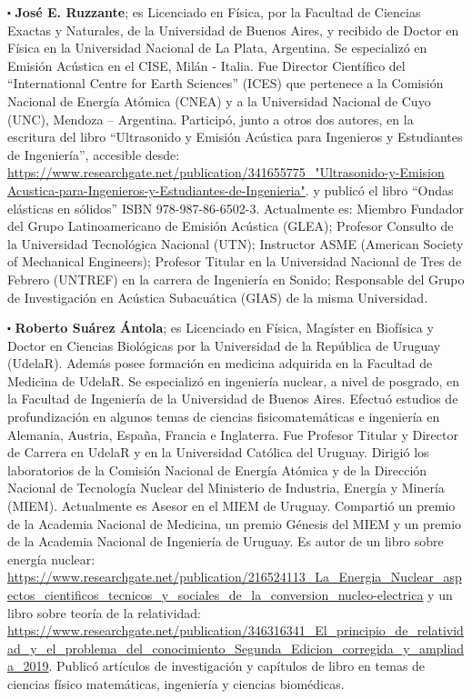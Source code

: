 \documentclass[
11pt, %
spanish,
singlespacing, %
parskip, %
headsepline, %
]{MastersDoctoralThesis} %
\begin{document}
\begin{sloppypar}


$\centerdot$ \textbf{José E. Ruzzante}; es Licenciado en Física, por la Facultad de Ciencias Exactas y Naturales, de la Universidad de Buenos Aires, y recibido de Doctor en Física en la Universidad Nacional de La Plata, Argentina. Se especializó en Emisión Acústica en el CISE, Milán - Italia. Fue Director Científico del “International Centre for Earth Sciences” (ICES) que pertenece a la Comisión Nacional de Energía Atómica (CNEA) y a la Universidad Nacional de Cuyo (UNC), Mendoza – Argentina. Participó, junto a otros dos autores, en la escritura del libro “Ultrasonido y Emisión Acústica para Ingenieros y Estudiantes de Ingeniería”, accesible desde: \url{https://www.researchgate.net/publication/341655775_"Ultrasonido-y-Emision Acustica-para-Ingenieros-y-Estudiantes-de-Ingenieria"}. y publicó el libro “Ondas elásticas en sólidos” ISBN 978-987-86-6502-3.
 Actualmente es:  Miembro Fundador del Grupo Latinoamericano de Emisión Acústica (GLEA);  Profesor Consulto de la Universidad Tecnológica Nacional (UTN);  Instructor ASME (American Society of Mechanical Engineers); Profesor Titular en la Universidad Nacional de Tres de Febrero (UNTREF) en la carrera de Ingeniería en Sonido;  Responsable del Grupo de Investigación en Acústica Subacuática (GIAS) de la misma Universidad.
 
$\centerdot$ \textbf{Roberto Suárez Ántola}; es Licenciado en Física, Magíster en Biofísica y Doctor en Ciencias Biológicas por la Universidad de la República de Uruguay (UdelaR).  Además posee formación en medicina adquirida en la Facultad de Medicina de UdelaR. Se especializó en ingeniería nuclear, a nivel de posgrado, en la Facultad de Ingeniería de la Universidad de Buenos Aires. Efectuó estudios de profundización en algunos temas de ciencias fisicomatemáticas e ingeniería en Alemania, Austria, España, Francia e Inglaterra.
Fue Profesor Titular y Director de Carrera en UdelaR y en la Universidad Católica del Uruguay. Dirigió los laboratorios de la Comisión Nacional de Energía Atómica y de la Dirección Nacional de Tecnología Nuclear del Ministerio de Industria, Energía y Minería (MIEM). Actualmente es Asesor en el MIEM de Uruguay. Compartió un premio de la Academia Nacional de Medicina, un premio Génesis del MIEM y un premio de la Academia Nacional de Ingeniería de Uruguay. Es autor de un libro sobre energía nuclear: \url{https://www.researchgate.net/publication/216524113_La_Energia_Nuclear_aspectos_cientificos_tecnicos_y_sociales_de_la_conversion_nucleo-electrica} y un libro sobre teoría de la relatividad: \url{https://www.researchgate.net/publication/346316341_El_principio_de_relatividad_y_el_problema_del_conocimiento_Segunda_Edicion_corregida_y_ampliada_2019}. Publicó artículos de investigación y capítulos de libro en temas de ciencias físico matemáticas, ingeniería y ciencias biomédicas.


\end{sloppypar}
\end{document}
